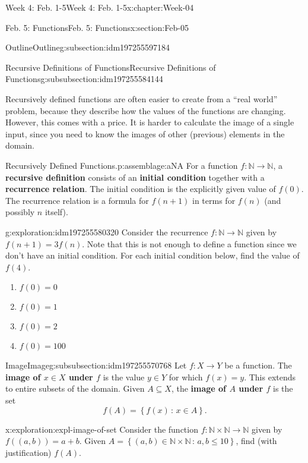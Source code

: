 \documentclass[oneside,10pt,]{book}
\newcommand{\terminology}[1]{\textbf{#1}}
\numberwithin{equation}{section}
\renewcommand{\le}{\leqslant}
\newcommand{\setof}[2]{{\left\{#1\,\colon\,#2\right\}}}
\def\N{{\mathbb N}}
\newcommand{\N}{\mathbb N}
\begin{document}
\begin{chapterptx}{Week 4: Feb. 1-5}{}{Week 4: Feb. 1-5}{}{}{x:chapter:Week-04}
\begin{sectionptx}{Feb. 5: Functions}{}{Feb. 5: Functions}{}{}{x:section:Feb-05}
\begin{subsectionptx}{Outline}{}{Outline}{}{}{g:subsection:idm197255597184}
\begin{subsubsectionptx}{Recursive Definitions of Functions}{}{Recursive Definitions of Functions}{}{}{g:subsubsection:idm197255584144}
\par
Recursively defined functions are often easier to create from a ``real world'' problem, because they describe how the values of the functions are changing. However, this comes with a price. It is harder to calculate the image of a single input, since you need to know the images of other (previous) elements in the domain.%
\begin{assemblage}{Recursively Defined Functions.}{p:assemblage:aNA}%
 For a function \(f:\N \to \N\), a \terminology{recursive definition} consists of an \terminology{initial condition} together with a \terminology{recurrence relation}. The initial condition is the explicitly given value of \(f(0)\). The recurrence relation is a formula for \(f(n+1)\) in terms for \(f(n)\) (and possibly \(n\) itself).%
\end{assemblage}
\begin{exploration}{}{g:exploration:idm197255580320}%
Consider the recurrence \(f : \N\to\N\) given by \(f(n+1) = 3f(n)\). Note that this is not enough to define a function since we don't have an initial condition. For each initial condition below, find the value of \(f(4)\).%
%
\begin{enumerate}
\item{}\(\displaystyle f(0)=0\)%
\item{}\(\displaystyle f(0)=1\)%
\item{}\(\displaystyle f(0)=2\)%
\item{}\(\displaystyle f(0)=100\)%
\end{enumerate}
\end{exploration}%
\end{subsubsectionptx}
%
%
\typeout{************************************************}
\typeout{************************************************}
%
\begin{subsubsectionptx}{Image}{}{Image}{}{}{g:subsubsection:idm197255570768}
Let \(f : X\to Y\) be a function. The \terminology{image of \(x\in X\) under \(f\)} is the value \(y\in Y\) for which \(f(x) = y\). This extends to entire subsets of the domain. Given \(A\subseteq X\), the \terminology{image of \(A\) under \(f\)} is the set%
\begin{equation*}
f(A) = \setof{f(x)}{x\in A}.
\end{equation*}
%
\begin{exploration}{}{x:exploration:expl-image-of-set}%
Consider the function \(f : \N\times\N \to \N\) given by \(f((a,b)) = a+b\). Given \(A = \setof{(a,b)\in \N\times\N}{a,b\le 10}\), find (with justification) \(f(A)\).%

\end{exploration}
\end{subsubsectionptx}
\end{subsectionptx}
\end{sectionptx}
\end{chapterptx}
\end{document}
